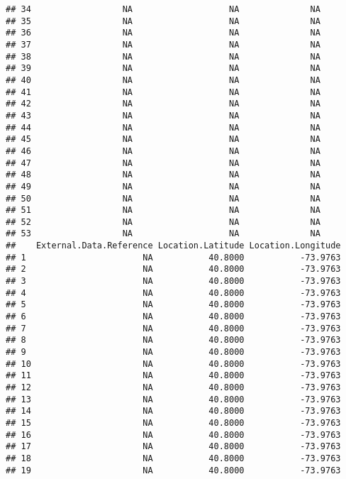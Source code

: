 \documentclass[]{article}
\begin{document}
\begin{verbatim}
## 34                  NA                   NA              NA
## 35                  NA                   NA              NA
## 36                  NA                   NA              NA
## 37                  NA                   NA              NA
## 38                  NA                   NA              NA
## 39                  NA                   NA              NA
## 40                  NA                   NA              NA
## 41                  NA                   NA              NA
## 42                  NA                   NA              NA
## 43                  NA                   NA              NA
## 44                  NA                   NA              NA
## 45                  NA                   NA              NA
## 46                  NA                   NA              NA
## 47                  NA                   NA              NA
## 48                  NA                   NA              NA
## 49                  NA                   NA              NA
## 50                  NA                   NA              NA
## 51                  NA                   NA              NA
## 52                  NA                   NA              NA
## 53                  NA                   NA              NA
##    External.Data.Reference Location.Latitude Location.Longitude
## 1                       NA           40.8000           -73.9763
## 2                       NA           40.8000           -73.9763
## 3                       NA           40.8000           -73.9763
## 4                       NA           40.8000           -73.9763
## 5                       NA           40.8000           -73.9763
## 6                       NA           40.8000           -73.9763
## 7                       NA           40.8000           -73.9763
## 8                       NA           40.8000           -73.9763
## 9                       NA           40.8000           -73.9763
## 10                      NA           40.8000           -73.9763
## 11                      NA           40.8000           -73.9763
## 12                      NA           40.8000           -73.9763
## 13                      NA           40.8000           -73.9763
## 14                      NA           40.8000           -73.9763
## 15                      NA           40.8000           -73.9763
## 16                      NA           40.8000           -73.9763
## 17                      NA           40.8000           -73.9763
## 18                      NA           40.8000           -73.9763
## 19                      NA           40.8000           -73.9763

\end{verbatim}
\end{document}
